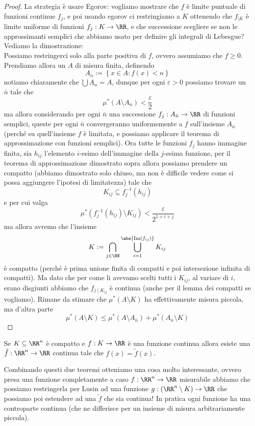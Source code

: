 \documentclass[11pt]{scrartcl}
\newcommand{\Immagine}[1]{\text{Im}\left(#1\right)}
\begin{document}
	\begin{proof}
		La strategia è usare Egorov: vogliamo mostrare che $f$ è limite puntuale di funzioni continue $f_j$, e poi usando egorov ci restringiamo a $K$ ottenendo che $f_{\mid K}$ è limite uniforme di funzioni $f_j:K\to\RR$, e che successione scegliere se non le approssimanti semplici che abbiamo usato per definire gli integrali di Lebesgue? Vediamo la dimostrazione: \\
		Possiamo restringerci solo alla parte positiva di $f$, ovvero assumiamo che $f\ge 0$. Prendiamo allora un $A$ di misura finita, definendo
		$$A_n:=\left\{x\in A:f(x)<n\right\}$$
		notiamo chiaramente che $\bigcup A_n=A$, dunque per ogni $\varepsilon>0$ possiamo trovare un $\bar{n}$ tale che
		$$\mu^*\left(A\setminus A_{\bar{n}}\right)<\frac{\varepsilon}{2}$$
		ma allora considerando per ogni $\bar{n}$ una successione $f_j:A_{\bar{n}}\to \RR$ di funzioni semplici, queste per ogni $\bar{n}$ convergeranno uniformemente a $f$ sull'insieme $A_{\bar{n}}$ (perché su quell'insieme $f$ è limitata, e possiamo applicare il teorema di approssimazione con funzioni semplici). Ora tutte le funzioni $f_j$ hanno immagine finita, sia $h_{ij}$ l'elemento $i$-esimo dell'immagine della $j$-esima funzione, per il teorema di approssimazione dimostrato sopra allora possiamo prendere un compatto (abbiamo dimostrato solo chiuso, ma non è difficile vedere come si possa aggiungere l'ipotesi di limitatezza) tale che
		$$K_{ij}\subseteq f_j^{-1}(h_{ij})$$
		e per cui valga
		$$\mu^*\left(f^{-1}_j(h_{ij})\setminus K_{ij}\right)<\frac{\varepsilon}{2^{1+i+j}}$$
		ma allora avremo che l'insieme 
		$$K:=\bigcap_{j\in\NN}\bigcup_{i=1}^{\abs{\Immagine{f_{ij}}}}K_{ij}$$
		è compatto (perché è prima unione finita di compatti e poi intersezione infinita di compatti). Ma dato che per come li avevamo scelti tutti i $K_{ij}$, al variare di $i$, erano disgiunti abbiamo che $f_{j\mid K_{ij}}$ è continua (anche per il lemma dei compatti se vogliamo). Rimane da stimare che $\mu^*(A\setminus K)$ ha effettivamente misura piccola, ma d'altra parte
		$$\mu^*(A\setminus K)\le \mu^*\left(A\setminus A_{\bar{n}}\right)+\mu^*\left(A_{\bar{n}}\setminus K\right)$$
	\end{proof}
	\begin{proposition}
		Se $K\subseteq \RR^n$ è compatto e $f:K\to\RR$ è una funzione continua allora esiste una $\tilde{f}:\RR^n\to\RR$ continua tale che $f(x)=\tilde{f}(x)$.
	\end{proposition}
	Combinando questi due teoremi otteniamo una cosa molto interessante, ovvero presa una funzione completamente a caso $f:\RR^n\to \RR$ misurabile abbiamo che possiamo restringerla per Lusin ad una funzione $g:\left(\RR^n\setminus K\right)\to\RR$ che possiamo poi estendere ad una $\tilde{f}$ che sia continua! In pratica ogni funzione ha una controparte continua (che ne differisce per un insieme di misura arbitrariamente piccola).
	
\end{document}
